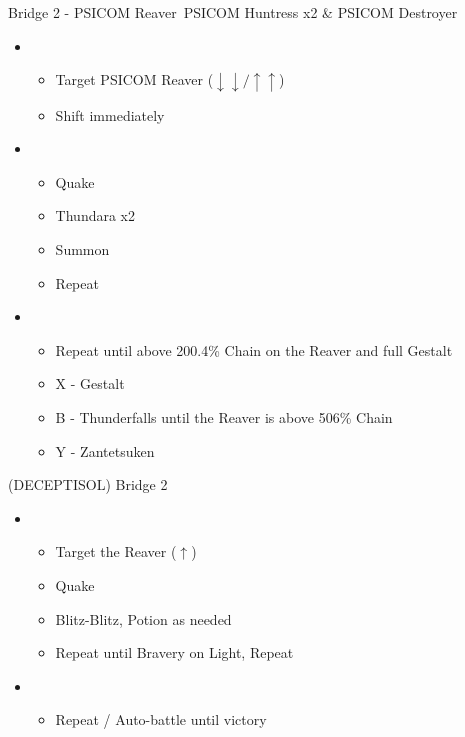 	\begin{battle}[0:45]{Bridge 2 - PSICOM Reaver\, PSICOM Huntress x2 \& PSICOM Destroyer}
		\begin{itemize}
			\item \first
			      \begin{itemize}
				      \item Target PSICOM Reaver ($\downarrow\downarrow/\uparrow\uparrow$)
				      \item Shift immediately
			      \end{itemize}
			\item \second
			      \begin{itemize}
				      \item Quake
				      \item Thundara x2
				      \item Summon
				      \item Repeat
			      \end{itemize}
			\item \third
			      \begin{itemize}
				      \item Repeat until above 200.4\% Chain on the Reaver and full Gestalt
				      \item X - Gestalt
				      \item B - Thunderfalls until the Reaver is above 506\% Chain
				      \item Y - Zantetsuken
			      \end{itemize}
		\end{itemize}
		   
	\end{battle}
	
	\begin{battle}[0:32]{(DECEPTISOL) Bridge 2}
		\begin{itemize}
			\item \first
				\begin{itemize}
					\item Target the Reaver ($\uparrow$)
					\item Quake
					\item Blitz-Blitz, Potion as needed
					\item Repeat until Bravery on Light, Repeat
				\end{itemize}
			\item \fifth
				\begin{itemize}
					\item Repeat / Auto-battle until victory
				\end{itemize}
		\end{itemize}
	\end{battle}
	
